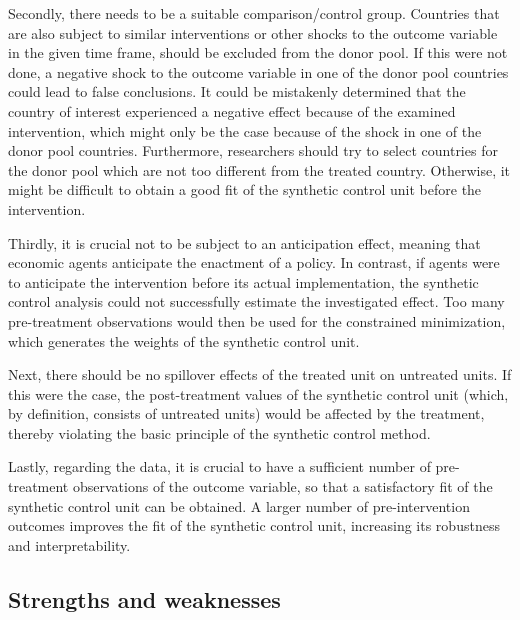 \documentclass{scrbook}
\begin{document}
Secondly, there needs to be a suitable comparison/control group.
Countries that are also subject to similar interventions or other shocks
to the outcome variable in the given time frame, should be excluded from
the donor pool. If this were not done, a negative shock to the outcome
variable in one of the donor pool countries could lead to false
conclusions. It could be mistakenly determined that the country of
interest experienced a negative effect because of the examined
intervention, which might only be the case because of the shock in one
of the donor pool countries. Furthermore, researchers should try to
select countries for the donor pool which are not too different from the
treated country. Otherwise, it might be difficult to obtain a good fit
of the synthetic control unit before the intervention.

Thirdly, it is crucial not to be subject to an anticipation effect,
meaning that economic agents anticipate the enactment of a policy. In
contrast, if agents were to anticipate the intervention before its
actual implementation, the synthetic control analysis could not
successfully estimate the investigated effect. Too many pre-treatment
observations would then be used for the constrained minimization, which
generates the weights of the synthetic control unit.

Next, there should be no spillover effects of the treated unit on
untreated units. If this were the case, the post-treatment values of the
synthetic control unit (which, by definition, consists of untreated
units) would be affected by the treatment, thereby violating the basic
principle of the synthetic control method.

Lastly, regarding the data, it is crucial to have a sufficient number of
pre-treatment observations of the outcome variable, so that a
satisfactory fit of the synthetic control unit can be obtained. A larger
number of pre-intervention outcomes improves the fit of the synthetic
control unit, increasing its robustness and interpretability.

\subsection*{Strengths and weaknesses}
\end{document}
